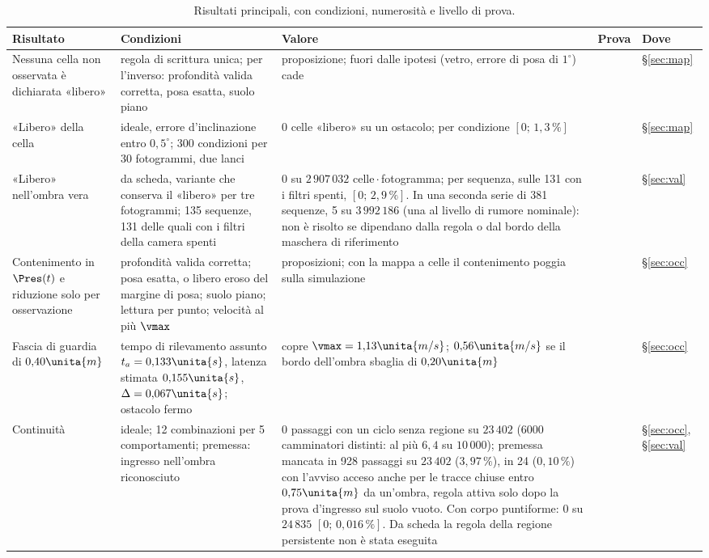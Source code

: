 \begin{table}[p]
\centering\footnotesize
\setlength{\tabcolsep}{4pt}
\caption{Risultati principali, con condizioni, numerosità e livello di prova.}\label{tab:intro-sintesi}
\begin{tabularx}{\textwidth}{@{}>{\RaggedRight\arraybackslash}p{2.8cm}>{\RaggedRight\arraybackslash}p{4.1cm}L>{\RaggedRight\arraybackslash}p{1.2cm}>{\RaggedRight\arraybackslash}p{1.05cm}@{}}
\toprule
Risultato & Condizioni & Valore & Prova & Dove\\
\midrule
Nessuna cella non osservata è dichiarata «libero» & regola di scrittura unica; per l'inverso: profondità valida corretta, posa esatta, suolo piano & proposizione; fuori dalle ipotesi (vetro, errore di posa di $1^\circ$) cade &  & \S\ref{sec:map}\\
«Libero» della cella & ideale, errore d'inclinazione entro $0{,}5^\circ$; 300 condizioni per 30 fotogrammi, due lanci & 0 celle «libero» su un ostacolo; per condizione $[0;\,1{,}3\,\%]$ &  & \S\ref{sec:map}\\
«Libero» nell'ombra vera & da scheda, variante che conserva il «libero» per tre fotogrammi; 135 sequenze, 131 delle quali con i filtri della camera spenti & 0 su $2\,907\,032$ celle\,$\cdot$\,fotogramma; per sequenza, sulle 131 con i filtri spenti, $[0;\,2{,}9\,\%]$. In una seconda serie di 381 sequenze, 5 su $3\,992\,186$ (una al livello di rumore nominale): non è risolto se dipendano dalla regola o dal bordo della maschera di riferimento &  & \S\ref{sec:val}\\
Contenimento in $\Pres(t)$ e riduzione solo per osservazione & profondità valida corretta; posa esatta, o libero eroso del margine di posa; suolo piano; lettura per punto; velocità al più $\vmax$ & proposizioni; con la mappa a celle il contenimento poggia sulla simulazione &  & \S\ref{sec:occ}\\
Fascia di guardia di $0{,}40\unita{m}$ & tempo di rilevamento assunto $t_a=0{,}133\unita{s}$, latenza stimata $0{,}155\unita{s}$, $\Delta=0{,}067\unita{s}$; ostacolo fermo & copre $\vmax=1{,}13\unita{m/s}$; $0{,}56\unita{m/s}$ se il bordo dell'ombra sbaglia di $0{,}20\unita{m}$ &  & \S\ref{sec:occ}\\
Continuità & ideale; 12 combinazioni per 5 comportamenti; premessa: ingresso nell'ombra riconosciuto & 0 passaggi con un ciclo senza regione su $23\,402$ (6000 camminatori distinti: al più $6{,}4$ su $10\,000$); premessa mancata in 928 passaggi su $23\,402$ ($3{,}97\,\%$), in 24 ($0{,}10\,\%$) con l'avviso acceso anche per le tracce chiuse entro $0{,}75\unita{m}$ da un'ombra, regola attiva solo dopo la prova d'ingresso sul suolo vuoto. Con corpo puntiforme: 0 su $24\,835$ $[0;\,0{,}016\,\%]$. Da scheda la regola della regione persistente non è stata eseguita &  & \S\ref{sec:occ}, \S\ref{sec:val}\\

\end{tabularx}
\end{table}
